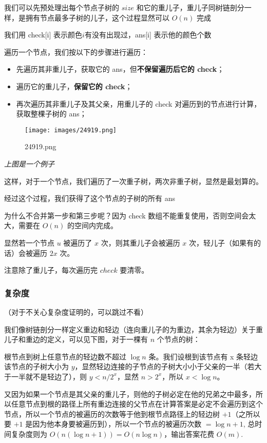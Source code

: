我们可以先预处理出每个节点子树的 $size$ 和它的重儿子，重儿子同树链剖分一样，是拥有节点最多子树的儿子，这个过程显然可以 $O(n)$ 完成

我们用 check[i] 表示颜色$i$有没有出现过，ans[i] 表示他的颜色个数

遍历一个节点，我们按以下的步骤进行遍历：

\begin{itemize}
\item 先遍历其非重儿子，获取它的 ans，但\textbf{不保留遍历后它的 check}；
\item 遍历它的重儿子，\textbf{保留它的 check}；
\item 再次遍历其非重儿子及其父亲，用重儿子的 check 对遍历到的节点进行计算，获取整棵子树的 ans；
\end{itemize}

\begin{figure}[h]
\centering
\texttt{[image: images/24919.png]} 
\caption{24919.png}
\end{figure}    

{\em 上图是一个例子 }

这样，对于一个节点，我们遍历了一次重子树，两次非重子树，显然是最划算的。

经过这个过程，我们获得了这个节点的子树的所有 ans

为什么不合并第一步和第三步呢？因为 check 数组不能重复使用，否则空间会太大，需要在 $O(n)$ 的空间内完成。

显然若一个节点 $u$ 被遍历了 $x$ 次，则其重儿子会被遍历 $x$ 次，轻儿子（如果有的话）会被遍历 $2x$ 次。

注意除了重儿子，每次遍历完 $check$ 要清零。

\subsubsection{复杂度}

（对于不关心复杂度证明的，可以跳过不看）

我们像树链剖分一样定义重边和轻边（连向重儿子的为重边，其余为轻边）关于重儿子和重边的定义，可以见下图，对于一棵有 $n$ 个节点的树：

根节点到树上任意节点的轻边数不超过 $\log n$ 条。我们设根到该节点有 x 条轻边该节点的子树大小为 $y$，显然轻边连接的子节点的子树大小小于父亲的一半（若大于一半就不是轻边了），则 $y<n/2^x$，显然 $n>2^x$，所以 $x<\log n$。

又因为如果一个节点是其父亲的重儿子，则他的子树必定在他的兄弟之中最多，所以任意节点到根的路径上所有重边连接的父节点在计算答案是必定不会遍历到这个节点，所以一个节点的被遍历的次数等于他到根节点路径上的轻边树 $+1$（之所以要 $+1$ 是因为他本身要被遍历到），所以一个节点的被遍历次数 $=\log n+1$, 总时间复杂度则为 $O(n(\log n+1))=O(n\log n)$，输出答案花费 $O(m)$.

